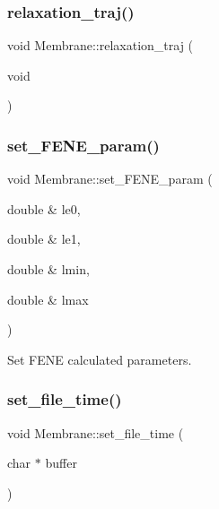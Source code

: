 \mbox{\label{classMembrane_aa4286fd20ae452585ec5d19c67268eed}} 
\subsubsection{\texorpdfstring{relaxation\_traj()}{relaxation\_traj()}}
{\footnotesize\ttfamily void Membrane\+::relaxation\+\_\+traj (\begin{DoxyParamCaption}\item[{void}]{ }\end{DoxyParamCaption})}

\mbox{\label{classMembrane_ae240d9a481d914b7e5092bb9183aa0fa}} 
\subsubsection{\texorpdfstring{set\_FENE\_param()}{set\_FENE\_param()}}
{\footnotesize\ttfamily void Membrane\+::set\+\_\+\+F\+E\+N\+E\+\_\+param (\begin{DoxyParamCaption}\item[{double \&}]{le0,  }\item[{double \&}]{le1,  }\item[{double \&}]{lmin,  }\item[{double \&}]{lmax }\end{DoxyParamCaption})\hspace{0.3cm}{\ttfamily [inline]}}

Set F\+E\+NE calculated parameters. \mbox{\label{classMembrane_a6b74827fd9dc653001b7cd6315b065a2}} 
\subsubsection{\texorpdfstring{set\_file\_time()}{set\_file\_time()}}
{\footnotesize\ttfamily void Membrane\+::set\+\_\+file\+\_\+time (\begin{DoxyParamCaption}\item[{char $\ast$}]{buffer }\end{DoxyParamCaption})\hspace{0.3cm}{\ttfamily [inline]}}

